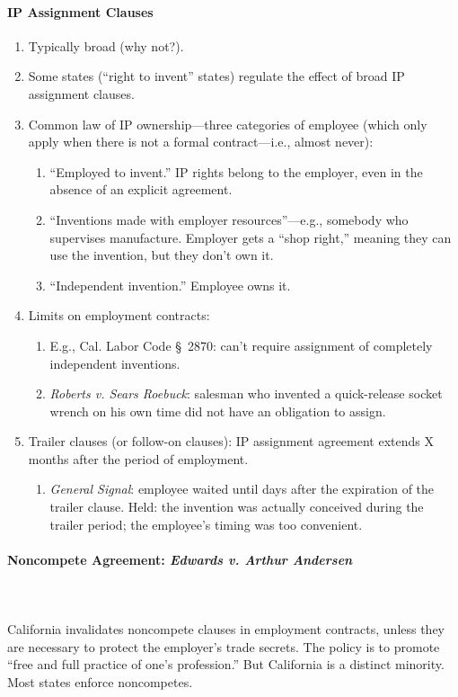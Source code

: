 \paragraph{IP Assignment Clauses}

\begin{enumerate}
    \item Typically broad (why not?).
    \item Some states (``right to invent'' states) regulate the effect of 
    broad IP assignment clauses.
    \item Common law of IP ownership---three categories of employee (which 
    only apply when there is not a formal contract---i.e., almost never):
    \begin{enumerate}
        \item ``Employed to invent.'' IP rights belong to the employer, even 
        in the absence of an explicit agreement.
        \item ``Inventions made with employer resources''---e.g., somebody who 
        supervises manufacture. Employer gets a ``shop right,'' meaning they 
        can use the invention, but they don't own it.
        \item ``Independent invention.'' Employee owns it.
    \end{enumerate}
    \item Limits on employment contracts:
    \begin{enumerate}
        \item E.g., Cal. Labor Code \S\ 2870: can't require assignment of 
        completely independent inventions.
        \item \emph{Roberts v. Sears Roebuck}: salesman who invented a 
        quick-release socket wrench on his own time did not have an obligation 
        to assign.
    \end{enumerate}
    \item Trailer clauses (or follow-on clauses): IP assignment agreement 
    extends X months after the period of employment.
    \begin{enumerate}
        \item \emph{General Signal}: employee waited until days after the 
        expiration of the trailer clause. Held: the invention was actually 
        conceived during the trailer period; the employee's timing was too 
        convenient.
    \end{enumerate}
\end{enumerate}

\paragraph{Noncompete Agreement: \emph{Edwards v. Arthur Andersen}}
~\\\\
California invalidates noncompete clauses in employment contracts, unless they 
are necessary to protect the employer's trade secrets. The policy is to 
promote ``free and full practice of one's profession.'' But California is a 
distinct minority. Most states enforce noncompetes.

